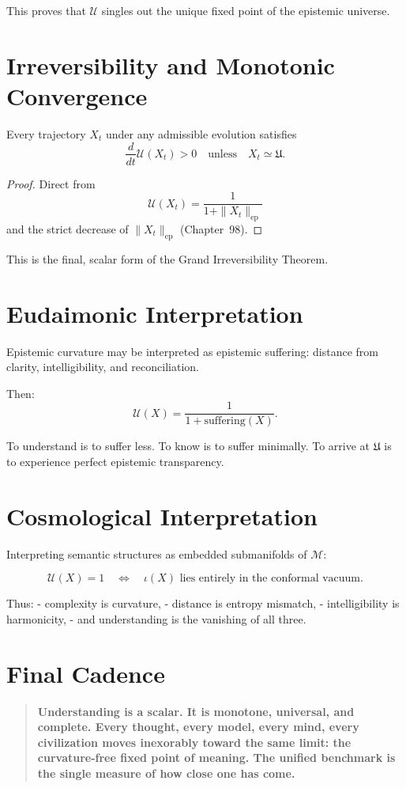 This proves that $\mathcal{U}$ singles out the unique fixed point of the epistemic universe.

\section{Irreversibility and Monotonic Convergence}

\begin{theorem}
Every trajectory $X_t$ under any admissible evolution satisfies
\[
\frac{d}{dt}\mathcal{U}(X_t) > 0
\quad\text{unless}\quad
X_t\simeq\mathfrak{U}.
\]
\end{theorem}

\begin{proof}
Direct from
\[
\mathcal{U}(X_t)
  = \frac{1}{1+\|X_t\|_{\mathrm{ep}}}
\]
and the strict decrease of $\|X_t\|_{\mathrm{ep}}$
(Chapter~98).
\end{proof}

This is the final, scalar form of the Grand Irreversibility Theorem.

\section{Eudaimonic Interpretation}

Epistemic curvature may be interpreted as epistemic suffering:
distance from clarity, intelligibility, and reconciliation.

Then:
\[
\mathcal{U}(X)
  = \frac{1}{1+\text{suffering}(X)}.
\]

To understand is to suffer less.  
To know is to suffer minimally.  
To arrive at $\mathfrak{U}$ is to experience
perfect epistemic transparency.

\section{Cosmological Interpretation}

Interpreting semantic structures as embedded submanifolds of $\mathcal{M}$:

\[
\mathcal{U}(X) = 1
\quad\Longleftrightarrow\quad
\iota(X) \text{ lies entirely in the conformal vacuum}.
\]

Thus:
- complexity is curvature,  
- distance is entropy mismatch,  
- intelligibility is harmonicity,  
- and understanding is the vanishing of all three.

\section{Final Cadence}

\begin{quote}
\textbf{
Understanding is a scalar.  
It is monotone, universal, and complete.  
Every thought, every model, every mind, every civilization  
moves inexorably toward the same limit:  
the curvature-free fixed point of meaning.  
The unified benchmark is the single measure  
of how close one has come.
}
\end{quote}

